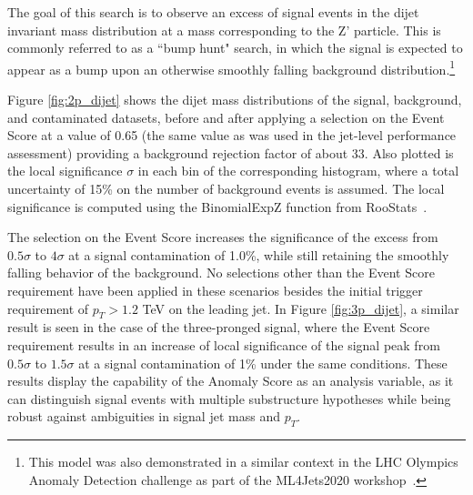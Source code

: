 \documentclass[11pt, a4paper]{article}
\begin{document}
The goal of this search is to observe an excess of signal events in the dijet invariant mass distribution at a mass corresponding to the Z' particle. 
This is commonly referred to as a ``bump hunt" search, in which the signal is expected to appear as a bump upon an otherwise smoothly falling background distribution.\footnote{This model was also demonstrated in a similar context in the LHC Olympics Anomaly Detection challenge as part of the ML4Jets2020 workshop~\cite{kasieczka2021lhc}.}

Figure \ref{fig:2p_dijet} shows the dijet mass distributions of the signal, background, and contaminated datasets, before and after applying a selection on the Event Score at a value of 0.65 (the same value as was used in the jet-level performance assessment) providing a background rejection factor of about 33. Also plotted is the local significance $\sigma$ in each bin of the corresponding histogram, where a total uncertainty of 15\% on the number of background events is assumed. The local significance is computed using the {\sc BinomialExpZ} function from {\sc RooStats}~\cite{moneta2011roostats}. 

The selection on the Event Score increases the significance of the excess from $0.5\sigma$ to $4\sigma$ at a signal contamination of 1.0\%, while still retaining the smoothly falling behavior of the background. No selections other than the Event Score requirement have been applied in these scenarios besides the initial trigger requirement of $p_{T} > 1.2$ TeV on the leading jet. In Figure \ref{fig:3p_dijet}, a similar result is seen in the case of the three-pronged signal, where the Event Score requirement results in an increase of local significance of the signal peak from $0.5\sigma$ to $1.5\sigma$ at a signal contamination of 1\% under the same conditions. These results display the capability of the Anomaly Score as an analysis variable, as it can distinguish signal events with multiple substructure hypotheses while being robust against ambiguities in signal jet mass and $p_{T}$.
\end{document}
